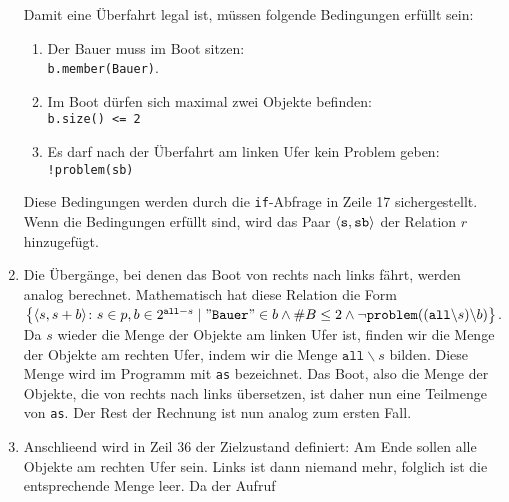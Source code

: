 \begin{enumerate}
      Damit eine Überfahrt legal ist, m\"ussen folgende Bedingungen erf\"ullt sein:
      \begin{enumerate}
      \item Der Bauer muss im Boot sitzen: 
            \\[0.2cm]
            \hspace*{1.3cm}
            \texttt{b.member(Bauer)}.
      \item Im Boot d\"urfen sich maximal zwei Objekte befinden:
            \\[0.2cm]
            \hspace*{1.3cm}
            \texttt{b.size() <= 2}
      \item Es darf nach der Überfahrt am linken Ufer kein Problem geben:
            \\[0.2cm]
            \hspace*{1.3cm}
            \texttt{!problem(sb)}
      \end{enumerate}
      Diese Bedingungen werden durch die \texttt{if}-Abfrage in Zeile 17 sichergestellt.
      Wenn die Bedingungen erf\"ullt sind, wird das Paar $\pair(\mathtt{s}, \mathtt{sb})$
      der Relation $r$ hinzugef\"ugt.
\item Die Überg\"ange, bei denen das Boot von rechts nach links f\"ahrt, werden analog
      berechnet.  Mathematisch hat diese Relation die Form
      \\[0.2cm]
      \hspace*{1.3cm}
      $\bigl\{ \pair(s, s + b) \colon s \in p, b \in 2^{\mathtt{all} - s} \mid
              \mathtt{\symbol{34}Bauer\symbol{34}} \in b \wedge \#B \leq 2 \wedge \neg
              \mathtt{problem}((\mathtt{all} \backslash s) \backslash b) 
       \bigr\}
      $.
      \\[0.2cm]
      Da $s$ wieder die Menge der Objekte am linken Ufer ist, finden wir die Menge der Objekte
      am rechten Ufer, indem wir die Menge $\mathtt{all} \backslash s$ bilden.  Diese
      Menge wird im Programm mit \texttt{as} bezeichnet.  Das Boot, also die Menge der
      Objekte, die von rechts nach links \"ubersetzen, ist daher nun eine Teilmenge von \texttt{as}.
      Der Rest der Rechnung ist nun analog zum ersten Fall.
\item Anschlie\3end wird in Zeil 36 der Zielzustand definiert:
      Am Ende sollen alle Objekte am rechten Ufer sein.  Links ist dann niemand mehr,
      folglich ist die entsprechende Menge leer.  Da der Aufruf
      \\[0.2cm]

\end{enumerate}
